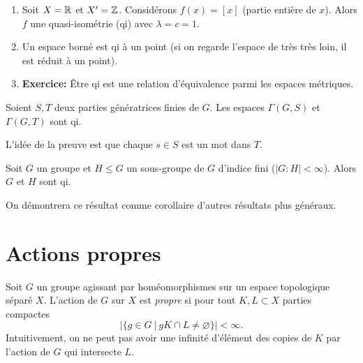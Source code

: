   \begin{exs}
    \begin{enumerate}
    \item Soit $X = \mathbb{R}$ et $X' = \mathbb{Z}$. Considérons $f(x) = [x]$ (partie entière de $x$). Alors $f$ une
      quasi-isométrie (qi) avec $\lambda = c = 1$.

    \item Un espace borné est qi à un point (si on regarde l'espace de très très loin, il est réduit à un
      point).
    \item \textbf{Exercice:} Être qi est une relation d'équivalence parmi les espaces métriques.
    \end{enumerate}
  \end{exs}


  \begin{prop}
    Soient $S, T$ deux parties génératrices finies de $G$. Les espaces $\Gamma(G, S)$ et $\Gamma(G, T)$ sont qi.
  \end{prop}

  \begin{preuve}
    L'idée de la preuve est que chaque $s \in S$ est un mot dans $T$.
  \end{preuve}


  \begin{prop}
    Soit $G$ un groupe et $H \leq G$ un sous-groupe de $G$ d'indice fini ($|G:H| < \infty$). Alors $G$ et $H$
    sont qi.
  \end{prop}

  \begin{preuve}
    On démontrera ce résultat comme corollaire d'autres résultats plus généraux.
  \end{preuve}

  
  
  \section{Actions propres}
  \label{sec:actions-propres}

  \begin{defi}
    Soit $G$ un groupe agissant par homéomorphismes sur un espace topologique séparé $X$. L'action de $G$ sur
    $X$ est \emph{propre}  si pour tout $K, L \subset X$ parties compactes 
      \[\left| \{g \in G\ |\ gK \cap L \neq \varnothing \}\right| < \infty.\]
    Intuitivement, on ne peut pas avoir une infinité d'élément des copies de $K$ par l'action de $G$ qui
    intersecte $L$.
  \end{defi}

